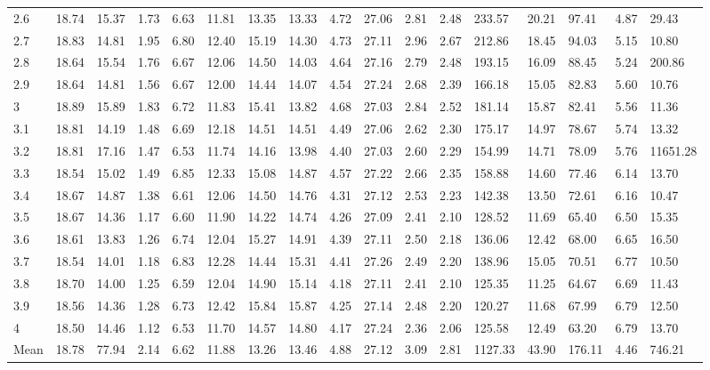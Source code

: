 \begin{adjustbox}{angle=90}
\begin{center}
\begin{tabular}{|l|llllllllllllllll|}
2.6&18.74&15.37&1.73&6.63&11.81&13.35&13.33&4.72&27.06&2.81&2.48&233.57&20.21&97.41&4.87&29.43  \\ 
2.7&18.83&14.81&1.95&6.80&12.40&15.19&14.30&4.73&27.11&2.96&2.67&212.86&18.45&94.03&5.15&10.80  \\ 
2.8&18.64&15.54&1.76&6.67&12.06&14.50&14.03&4.64&27.16&2.79&2.48&193.15&16.09&88.45&5.24&200.86  \\ 
2.9&18.64&14.81&1.56&6.67&12.00&14.44&14.07&4.54&27.24&2.68&2.39&166.18&15.05&82.83&5.60&10.76  \\ 
3&18.89&15.89&1.83&6.72&11.83&15.41&13.82&4.68&27.03&2.84&2.52&181.14&15.87&82.41&5.56&11.36  \\ 
3.1&18.81&14.19&1.48&6.69&12.18&14.51&14.51&4.49&27.06&2.62&2.30&175.17&14.97&78.67&5.74&13.32  \\ 
3.2&18.81&17.16&1.47&6.53&11.74&14.16&13.98&4.40&27.03&2.60&2.29&154.99&14.71&78.09&5.76&11651.28  \\ 
3.3&18.54&15.02&1.49&6.85&12.33&15.08&14.87&4.57&27.22&2.66&2.35&158.88&14.60&77.46&6.14&13.70  \\ 
3.4&18.67&14.87&1.38&6.61&12.06&14.50&14.76&4.31&27.12&2.53&2.23&142.38&13.50&72.61&6.16&10.47  \\ 
3.5&18.67&14.36&1.17&6.60&11.90&14.22&14.74&4.26&27.09&2.41&2.10&128.52&11.69&65.40&6.50&15.35  \\ 
3.6&18.61&13.83&1.26&6.74&12.04&15.27&14.91&4.39&27.11&2.50&2.18&136.06&12.42&68.00&6.65&16.50  \\ 
3.7&18.54&14.01&1.18&6.83&12.28&14.44&15.31&4.41&27.26&2.49&2.20&138.96&15.05&70.51&6.77&10.50  \\ 
3.8&18.70&14.00&1.25&6.59&12.04&14.90&15.14&4.18&27.11&2.41&2.10&125.35&11.25&64.67&6.69&11.43  \\ 
3.9&18.56&14.36&1.28&6.73&12.42&15.84&15.87&4.25&27.14&2.48&2.20&120.27&11.68&67.99&6.79&12.50  \\ 
4 & 18.50&14.46&1.12&6.53&11.70&14.57&14.80&4.17&27.24&2.36&2.06&125.58&12.49&63.20&6.79&13.70  \\ \hline \hline
Mean & 18.78&77.94&2.14&6.62&11.88&13.26&13.46&4.88&27.12&3.09&2.81&1127.33&43.90&176.11&4.46&746.21  \\ \hline
\end{tabular}
\end{center}
\end{adjustbox}





